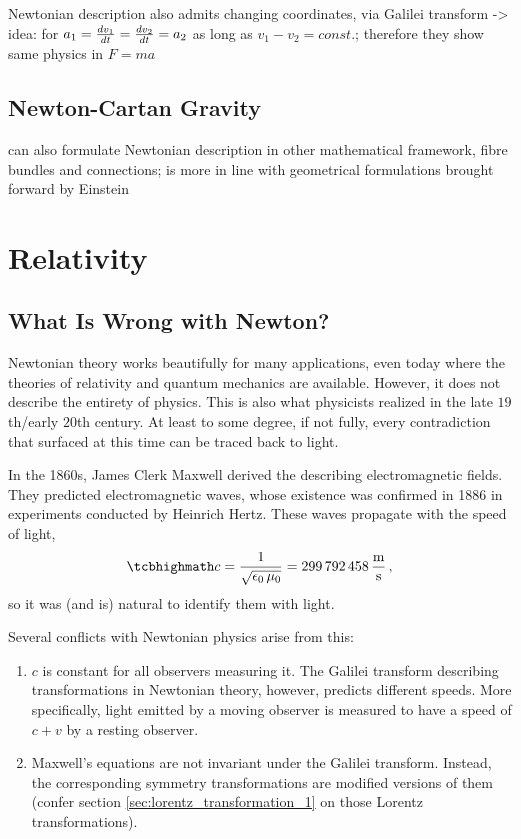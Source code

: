Newtonian description also admits changing coordinates, via Galilei transform -> idea: for $a_1 = \dv{v_1}{t} = \dv{v_2}{t} = a_2$ as long as $v_1 - v_2 = const.$; therefore they show same physics in $F = m a$




		\subsection{Newton-Cartan Gravity}
can also formulate Newtonian description in other mathematical framework, fibre bundles and connections; is more in line with geometrical formulations brought forward by Einstein



\newpage



	\section{Relativity}
		\subsection{What Is Wrong with Newton?}
Newtonian theory works beautifully for many applications, even today where the theories of relativity and quantum mechanics are available. However, it does not describe the entirety of physics. This is also what physicists realized in the late $19$th/early $20$th century. At least to some degree, if not fully, every contradiction that surfaced at this time can be traced back to light.

In the 1860s, James Clerk Maxwell derived the  describing electromagnetic fields. They predicted electromagnetic waves, whose existence was confirmed in 1886 in experiments conducted by Heinrich Hertz. These waves propagate with the speed of light,
\begin{equation}\label{eq:speed_of_light}
	\eqbox{
	c = \frac{1}{\sqrt{\epsilon_0 \, \mu_0}} = 299 \, 792 \, 458 \, \frac{\metre}{\second}
	} \, ,
\end{equation}
so it was (and is) natural to identify them with light.


Several conflicts with Newtonian physics arise from this:
\begin{enumerate}
	\item $c$ is constant for all observers measuring it. The Galilei transform describing transformations in Newtonian theory, however, predicts different speeds. More specifically, light emitted by a moving observer is measured to have a speed of $c + v$ by a resting observer.


	\item Maxwell's equations are not invariant under the Galilei transform. Instead, the corresponding symmetry transformations are modified versions of them (confer section \ref{sec:lorentz_transformation_1} on those Lorentz transformations).
\end{enumerate}

